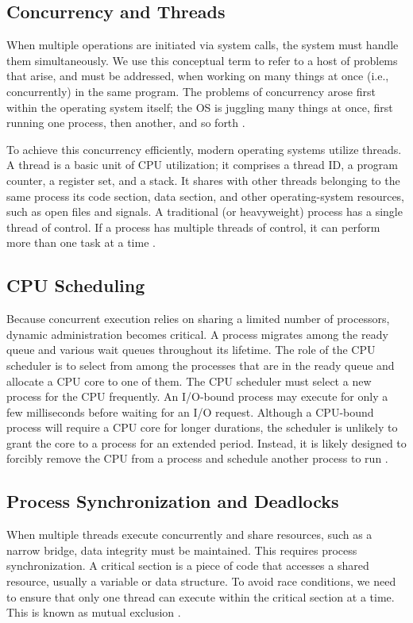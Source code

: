 \documentclass[12pt]{article}
\begin{document}
\subsection{Concurrency and Threads}
When multiple operations are initiated via system calls, the system must handle them simultaneously. We use this conceptual term to refer to a host of problems that arise, and must be addressed, when working on many things at once (i.e., concurrently) in the same program. The problems of concurrency arose first within the operating system itself; the OS is juggling many things at once, first running one process, then another, and so forth \cite[Chap.~2, p.~6]{three_easy}.

To achieve this concurrency efficiently, modern operating systems utilize threads. A thread is a basic unit of CPU utilization; it comprises a thread ID, a program counter, a register set, and a stack. It shares with other threads belonging to the same process its code section, data section, and other operating-system resources, such as open files and signals. A traditional (or heavyweight) process has a single thread of control. If a process has multiple threads of control, it can perform more than one task at a time \cite[Chap.~4, p.~160]{silberschatz_os}.



\subsection{CPU Scheduling}
Because concurrent execution relies on sharing a limited number of processors, dynamic administration becomes critical. A process migrates among the ready queue and various wait queues throughout its lifetime. The role of the CPU scheduler is to select from among the processes that are in the ready queue and allocate a CPU core to one of them. The CPU scheduler must select a new process for the CPU frequently. An I/O-bound process may execute for only a few milliseconds before waiting for an I/O request. Although a CPU-bound process will require a CPU core for longer durations, the scheduler is unlikely to grant the core to a process for an extended period. Instead, it is likely designed to forcibly remove the CPU from a process and schedule another process to run \cite[Chap.~3, p.~113]{silberschatz_os}.

\subsection{Process Synchronization and Deadlocks}
When multiple threads execute concurrently and share resources, such as a narrow bridge, data integrity must be maintained. This requires process synchronization. A critical section is a piece of code that accesses a shared resource, usually a variable or data structure. To avoid race conditions, we need to ensure that only one thread can execute within the critical section at a time. This is known as mutual exclusion \cite[Chap.~28, p.~3]{three_easy}.
\end{document}
